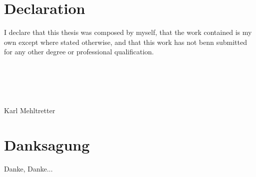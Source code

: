 \chapter*{Declaration}
I declare that this thesis was composed by myself, that the work contained is my own except where stated otherwise, and that this work has not benn submitted for any other degree or professional qualification.\\
\\
\\
\\
\\
\\
{\Large Karl Mehltretter}\\
\chapter*{Danksagung}
Danke, Danke...
